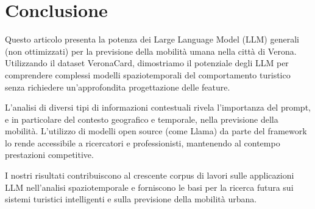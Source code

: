 \section{Conclusione}

Questo articolo presenta la potenza dei Large Language Model (LLM) generali (non ottimizzati) per la previsione della mobilità umana nella città di Verona.
Utilizzando il dataset VeronaCard, dimostriamo il potenziale degli LLM per comprendere complessi modelli spaziotemporali del comportamento turistico senza richiedere un'approfondita progettazione delle feature.

L'analisi di diversi tipi di informazioni contestuali rivela l'importanza del prompt, e in particolare del contesto geografico e temporale, nella previsione della mobilità. L'utilizzo di modelli open source (come Llama) da parte del framework lo rende accessibile a ricercatori e professionisti, mantenendo al contempo prestazioni competitive.

I nostri risultati contribuiscono al crescente corpus di lavori sulle applicazioni LLM nell'analisi spaziotemporale e forniscono le basi per la ricerca futura sui sistemi turistici intelligenti e sulla previsione della mobilità urbana.
